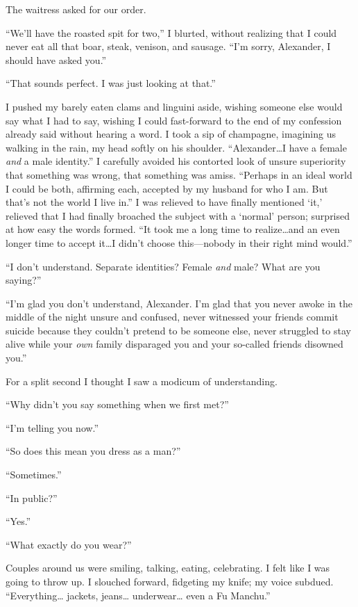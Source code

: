The waitress asked for our order.

``We'll have the roasted spit for two,'' I blurted, without realizing
that I could never eat all that boar, steak, venison, and sausage. ``I'm
sorry, Alexander, I should have asked you.''

``That sounds perfect. I was just looking at that.''

I pushed my barely eaten clams and linguini aside, wishing someone else
would say what I had to say, wishing I could fast-forward to the end of
my confession already said without hearing a word. I took a sip of
champagne, imagining us walking in the rain, my head softly on his
shoulder. ``Alexander\ldots I have a female \emph{and} a male
identity.'' I carefully avoided his contorted look of unsure superiority
that something was wrong, that something was amiss. ``Perhaps in an
ideal world I could be both, affirming each, accepted by my husband for
who I am. But that's not the world I live in.'' I was relieved to have
finally mentioned `it,' relieved that I had finally broached the subject
with a `normal' person; surprised at how easy the words formed. ``It
took me a long time to realize\ldots and an even longer time to accept
it\ldots I didn't choose this---nobody in their right mind would.''

``I don't understand. Separate identities? Female \emph{and} male? What
are you saying?''

``I'm glad you don't understand, Alexander. I'm glad that you never
awoke in the middle of the night unsure and confused, never witnessed
your friends commit suicide because they couldn't pretend to be someone
else, never struggled to stay alive while your \emph{own} family
disparaged you and your so-called friends disowned you.''

For a split second I thought I saw a modicum of understanding.

``Why didn't you say something when we first met?''

``I'm telling you now.''

``So does this mean you dress as a man?''

``Sometimes.''

``In public?''

``Yes.''

``What exactly do you wear?''

Couples around us were smiling, talking, eating, celebrating. I felt
like I was going to throw up. I slouched forward, fidgeting my knife; my
voice subdued. ``Everything\ldots{} jackets, jeans\ldots{}
underwear\ldots{} even a Fu Manchu.''

